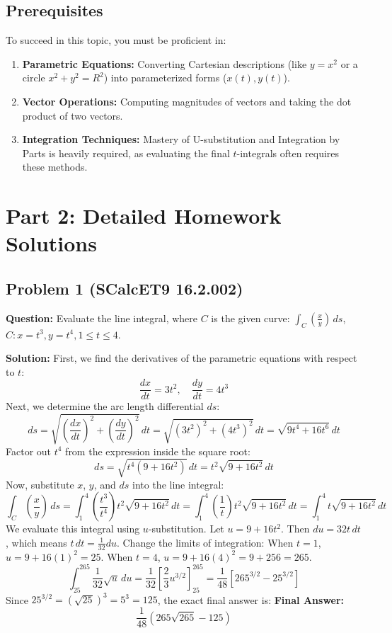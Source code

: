 \documentclass{article}
\begin{document}
\subsection{Prerequisites}
To succeed in this topic, you must be proficient in:
\begin{enumerate}
    \item \textbf{Parametric Equations:} Converting Cartesian descriptions (like $y = x^2$ or a circle $x^2 + y^2 = R^2$) into parameterized forms ($x(t), y(t)$).
    \item \textbf{Vector Operations:} Computing magnitudes of vectors and taking the dot product of two vectors.
    \item \textbf{Integration Techniques:} Mastery of U-substitution and Integration by Parts is heavily required, as evaluating the final $t$-integrals often requires these methods.
\end{enumerate}

\newpage

\section{Part 2: Detailed Homework Solutions}

\subsection{Problem 1 (SCalcET9 16.2.002)}
\textbf{Question:} Evaluate the line integral, where $C$ is the given curve: $\int_C \left(\frac{x}{y}\right) \, ds$, $C: x = t^3, y = t^4, 1 \leq t \leq 4$.

\textbf{Solution:}
First, we find the derivatives of the parametric equations with respect to $t$:
\[ \frac{dx}{dt} = 3t^2, \quad \frac{dy}{dt} = 4t^3 \]
Next, we determine the arc length differential $ds$:
\[ ds = \sqrt{\left(\frac{dx}{dt}\right)^2 + \left(\frac{dy}{dt}\right)^2} \, dt = \sqrt{(3t^2)^2 + (4t^3)^2} \, dt = \sqrt{9t^4 + 16t^6} \, dt \]
Factor out $t^4$ from the expression inside the square root:
\[ ds = \sqrt{t^4(9 + 16t^2)} \, dt = t^2\sqrt{9 + 16t^2} \, dt \]
Now, substitute $x$, $y$, and $ds$ into the line integral:
\[ \int_C \left(\frac{x}{y}\right) \, ds = \int_1^4 \left(\frac{t^3}{t^4}\right) t^2\sqrt{9 + 16t^2} \, dt = \int_1^4 \left(\frac{1}{t}\right) t^2\sqrt{9 + 16t^2} \, dt = \int_1^4 t\sqrt{9 + 16t^2} \, dt \]
We evaluate this integral using $u$-substitution. Let $u = 9 + 16t^2$. Then $du = 32t \, dt$, which means $t \, dt = \frac{1}{32} du$.
Change the limits of integration:
When $t = 1$, $u = 9 + 16(1)^2 = 25$.
When $t = 4$, $u = 9 + 16(4)^2 = 9 + 256 = 265$.
\[ \int_{25}^{265} \frac{1}{32} \sqrt{u} \, du = \frac{1}{32} \left[ \frac{2}{3} u^{3/2} \right]_{25}^{265} = \frac{1}{48} \left[ 265^{3/2} - 25^{3/2} \right] \]
Since $25^{3/2} = (\sqrt{25})^3 = 5^3 = 125$, the exact final answer is:
\textbf{Final Answer:} 
\[ \frac{1}{48} (265\sqrt{265} - 125) \]
\end{document}
